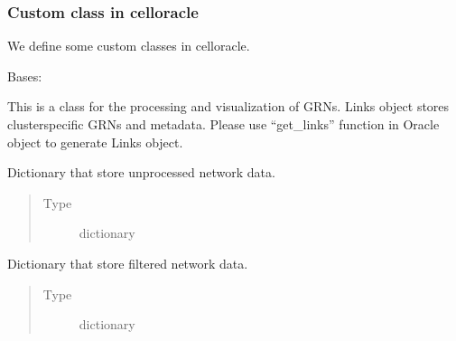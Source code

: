 \documentclass[letterpaper,10pt,english]{sphinxmanual}
\begin{document}
\subsubsection{Custom class in celloracle}
\label{\detokenize{modules/celloracle:custom-class-in-celloracle}}\label{\detokenize{modules/celloracle::doc}}
We define some custom classes in celloracle.

\label{\detokenize{modules/celloracle:module-celloracle}}

\begin{fulllineitems}
\label{\detokenize{modules/celloracle:celloracle.Links}}
Bases: 

This is a class for the processing and visualization of GRNs.
Links object stores cluster\sphinxhyphen{}specific GRNs and metadata.
Please use “get\_links” function in Oracle object to generate Links object.

\begin{fulllineitems}
\label{\detokenize{modules/celloracle:celloracle.Links.links_dict}}
Dictionary that store unprocessed network data.
\begin{quote}\begin{description}
\item[{Type}] \leavevmode
dictionary

\end{description}\end{quote}

\end{fulllineitems}


\begin{fulllineitems}
\label{\detokenize{modules/celloracle:celloracle.Links.filtered_links}}
Dictionary that store filtered network data.
\begin{quote}\begin{description}
\item[{Type}] \leavevmode
dictionary


\end{description}
\end{quote}
\end{fulllineitems}
\end{fulllineitems}
\end{document}
